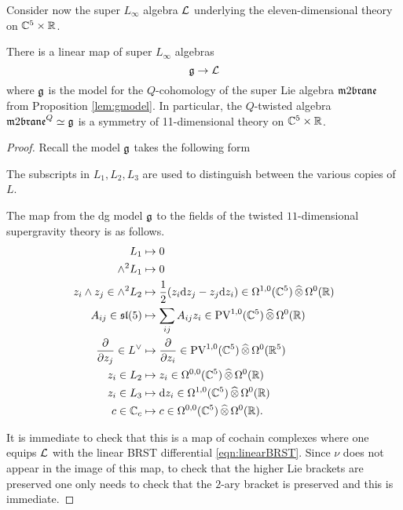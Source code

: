\documentclass[11pt]{amsart}
\begin{document}
\parsec[s:residual]
Consider now the super $L_\infty$ algebra $\mathcal L$ underlying the eleven-dimensional theory on $\mathbb C^5 \times \mathbb R$. 

\begin{prop}
There is a linear map of super $L_\infty$ algebras 
\[
\mathfrak g \to \mathcal L 
\]
where $\mathfrak g$ is the model for the $Q$-cohomology of the super Lie algebra $\m2$ from Proposition \ref{lem:gmodel}. 
In particular, the $Q$-twisted algebra $\m2^Q \simeq \fg$ is a symmetry of 11-dimensional theory on $\mathbb C^5 \times \mathbb R$. 
\end{prop}
\begin{proof}
Recall the model $\mathfrak g$ takes the following form
\beqn 
{}
\eeqn
The subscripts in $L_1, L_2, L_3$ are used to distinguish between the various copies of $L$.

The map from the dg model $\mathfrak g$ to the fields of the twisted $11$-dimensional supergravity theory is as follows. 
\begin{align*}
 L_1 & \mapsto 0 \\
 \wedge^2 L_1 & \mapsto 0 \\
z_i \wedge z_j \in \wedge^2 L_2 & \mapsto \frac12 (z_i {\rm d} z_j - z_j {\rm d} z_i) \in \Omega^{1,0} (\mathbb C^5) \, \widehat{\otimes} \, \Omega^0 (\mathbb R) \\
A_{ij} \in \mathfrak{sl}(5) & \mapsto \sum_{ij} A_{ij} z_i \in {\rm PV}^{1,0}(\mathbb C^5) \, \widehat{\otimes} \, \Omega^0(\mathbb R) \\\frac{\partial}{\partial z_j} \in L^\vee & \mapsto
\frac{\partial}{\partial z_i} \in {\rm PV}^{1,0} (\mathbb C^5) \, \widehat{\otimes} \, \Omega^0 (\mathbb R^5) \\ z_i \in L_2 & \mapsto z_i \in \Omega^{0,0}(\mathbb C^5) \, \widehat{\otimes} \, \Omega^0 (\mathbb R) \\
z_i \in L_3 & \mapsto {\rm d} z_i \in \Omega^{1,0}(\mathbb C^5) \, \widehat{\otimes} \, \Omega^0 (\mathbb R) \\
c \in \mathbb C_c & \mapsto c \in \Omega^{0,0}(\mathbb C^5) \, \widehat{\otimes} \, \Omega^0 (\mathbb R) .
\end{align*}

It is immediate to check that this is a map of cochain complexes where one equips $\mathcal L$ with the linear BRST differential \eqref{eqn:linearBRST}.
Since $\nu$ does not appear in the image of this map, to check that the higher Lie brackets are preserved one only needs to check that the $2$-ary bracket is preserved and this is immediate. 
\end{proof}
\end{document}
